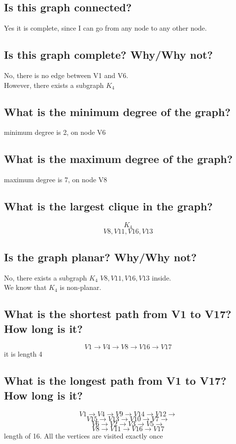 \documentclass[a4paper,12pt]{article}
\begin{document}
\subsection{Is this graph connected?}
Yes it is complete, since I can go from any node to any other node.
\subsection{Is this graph complete?  Why/Why not?}
No, there is no edge between V1 and V6.\\
However, there exists a subgraph $K_{4}$
\subsection{What is the minimum degree of the graph?}
minimum degree is 2, on node V6
\subsection{What is the maximum degree of the graph?}
maximum degree is 7, on node V8
\subsection{What is the largest clique in the graph?}
\[K_{4}\] \[V8,V11,V16,V13\]

\subsection{Is the graph planar? Why/Why not?}
No, there exists a subgraph $K_{4}$ $V8,V11,V16,V13$ inside.\\
We know that $K_{4}$ is non-planar.\\
\subsection{What is the shortest path from V1 to V17? How long is it?}

\[V1\rightarrow V4\rightarrow V8\rightarrow V16\rightarrow V17\]
it is length 4
\subsection{What is the longest path from V1 to V17?  How long is it?}
\[V1\rightarrow V4 \rightarrow V9 \rightarrow V14 \rightarrow V12 \rightarrow\]
\[V15 \rightarrow V13 \rightarrow V10 \rightarrow V7 \rightarrow\]
\[V6 \rightarrow V2\rightarrow V3\rightarrow V5 \rightarrow\]
\[V8 \rightarrow V11\rightarrow V16\rightarrow V17 \]
length of 16. All the vertices are visited exactly once
\end{document}
